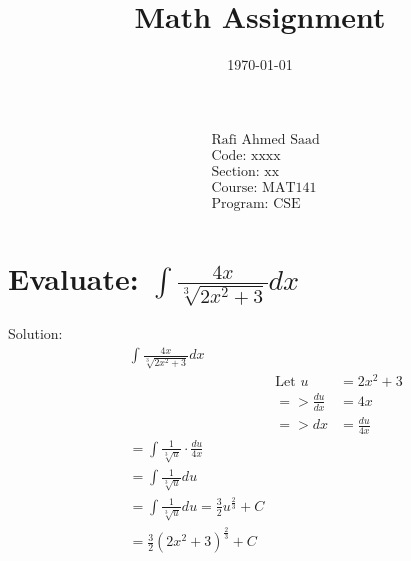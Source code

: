 \documentclass{article}
\title{Math Assignment}
\date{\today}
\begin{document}
\maketitle %

\begin{align*}
     & \text{Rafi Ahmed Saad}     \\
     & \text{Code: xxxx} \\
     & \text{Section: xx}         \\
     & \text{Course: MAT141}      \\
     & \text{Program: CSE}        \\
\end{align*}

\newpage
\section{Evaluate: $\int \frac{4x}{\sqrt[3]{2x^2 + 3}} dx$}
Solution:
\begin{align*}
     & \int \frac{4x}{\sqrt[3]{2x^2 + 3}} dx                                                                 \\
     &                                                                   & \text{Let } u   & = 2x^2 + 3      \\
     &                                                                   & =>\frac{du}{dx} & = 4x            \\
     &                                                                   & =>dx            & = \frac{du}{4x} \\
     & = \int \frac{1}{\sqrt[3]{u}} \cdot \frac{du}{4x}                                                      \\
     & = \int \frac{1}{\sqrt[3]{u}} du                                                                       \\
     & = \int \frac{1}{\sqrt[3]{u}} du = \frac{3}{2} u^{\frac{2}{3}} + C                                     \\
     & = \frac{3}{2} (2x^2 + 3)^{\frac{2}{3}} + C
\end{align*}
\end{document}
